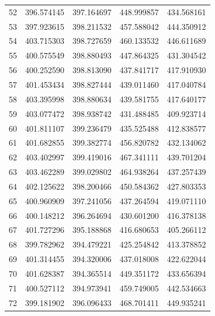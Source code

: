 \begin{table}
\begin{tabular}{rrrrr}
52 & 396.574145 & 397.164697 & 448.999857 & 434.568161 \\
53 & 397.923615 & 398.211532 & 457.588042 & 444.350912 \\
54 & 403.715303 & 398.727659 & 460.133532 & 446.611689 \\
55 & 400.575549 & 398.880493 & 447.864325 & 431.304542 \\
56 & 400.252590 & 398.813090 & 437.841717 & 417.910930 \\
57 & 401.453434 & 398.827444 & 439.011460 & 417.040784 \\
58 & 403.395998 & 398.880634 & 439.581755 & 417.640177 \\
59 & 403.077472 & 398.938742 & 431.488485 & 409.923714 \\
60 & 401.811107 & 399.236479 & 435.525488 & 412.838577 \\
61 & 401.682855 & 399.382774 & 456.820782 & 432.134062 \\
62 & 403.402997 & 399.419016 & 467.341111 & 439.701204 \\
63 & 403.462289 & 399.029802 & 464.938264 & 437.257439 \\
64 & 402.125622 & 398.200466 & 450.584362 & 427.803353 \\
65 & 400.960909 & 397.241056 & 437.264594 & 419.071110 \\
66 & 400.148212 & 396.264694 & 430.601200 & 416.378138 \\
67 & 401.727296 & 395.188868 & 416.680653 & 405.266112 \\
68 & 399.782962 & 394.479221 & 425.254842 & 413.378852 \\
69 & 401.314455 & 394.320006 & 437.018008 & 422.622044 \\
70 & 401.628387 & 394.365514 & 449.351172 & 433.656394 \\
71 & 400.527112 & 394.973941 & 459.749005 & 442.534663 \\
72 & 399.181902 & 396.096433 & 468.701411 & 449.935241 \\
\bottomrule
\end{tabular}
\end{table}
